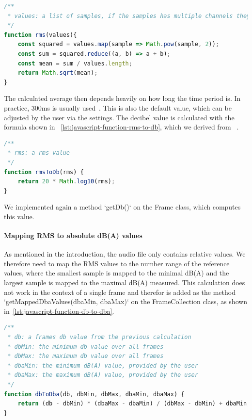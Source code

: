 \begin{lstlisting}[caption={JavaScript RMS function},label={lst:javascript-function-rms},language=JavaScript]
/**
 * values: a list of samples, if the samples has multiple channels they need to be averaged beforehand
 */
function rms(values){
    const squared = values.map(sample => Math.pow(sample, 2));
    const sum = squared.reduce((a, b) => a + b);
    const mean = sum / values.length;
    return Math.sqrt(mean);
}
\end{lstlisting}

The calculated average then depends heavily on how long the time period is.
In practice, 300ms is usually used~\cite{timespan_for_audio_rms_calculate}.
This is also the default value, which can be adjusted by the user via the settings.
The decibel value is calculated with the formula shown in ~\ref{lst:javascript-function-rms-to-db}, which we derived from ~\cite{decibel_wikipedia}.

\begin{lstlisting}[caption={JavaScript RMS to DB function},label={lst:javascript-function-rms-to-db},language=JavaScript]
/**
 * rms: a rms value
 */
function rmsToDb(rms) {
    return 20 * Math.log10(rms);
}
\end{lstlisting}

We implemented again a method `getDb()` on the Frame class, which computes this value.

\paragraph{Mapping RMS to absolute dB(A) values}
As mentioned in the introduction, the audio file only contains relative values.
We therefore need to map the RMS values to the number range of the reference values,
where the smallest sample is mapped to the minimal dB(A) and the largest sample is mapped to the maximal dB(A) measured.
This calculation does not work in the context of a single frame and therefor is added as the method `getMappedDbaValues(dbaMin, dbaMax)` on the FrameCollection class,
as shown in~\ref{lst:javascript-function-db-to-dba}.

\begin{lstlisting}[caption={JavaScript DB to DBA function},label={lst:javascript-function-db-to-dba},language=JavaScript]
/**
 * db: a frames db value from the previous calculation
 * dbMin: the minimum db value over all frames
 * dbMax: the maximum db value over all frames
 * dbaMin: the minimum dB(A) value, provided by the user
 * dbaMax: the maximum dB(A) value, provided by the user
 */
function dbToDba(db, dbMin, dbMax, dbaMin, dbaMax) {
    return (db - dbMin) * (dbaMax - dbaMin) / (dbMax - dbMin) + dbaMin;
}
\end{lstlisting}

